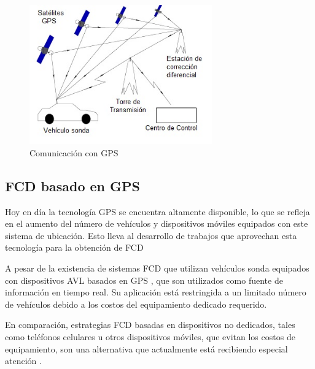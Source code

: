 \begin{figure}[h]
	\centering
	\includegraphics[width=0.7\textwidth]{capitulos/3/figuras/figura4.jpg}
	\caption{\label{fig:ComunicacionGPS}  Comunicación con GPS}	
\end{figure}

\subsection{FCD basado en GPS}


Hoy en día la tecnología GPS se encuentra altamente disponible, lo que se refleja en el aumento del número de vehículos y dispositivos móviles equipados con este sistema de ubicación. Esto lleva al desarrollo de trabajos que aprovechan esta tecnología para la obtención de FCD \cite{giovannini2011novel,li2007practical,sevlian2010travel,yin2004weight}


A pesar de la existencia de sistemas FCD que utilizan vehículos sonda equipados con dispositivos AVL basados en GPS \cite{simmons2002commercial,leduc2008road}, que son utilizados como fuente de información en tiempo real. Su aplicación está restringida a un limitado número de vehículos debido a los costos del equipamiento dedicado requerido. 

En comparación, estrategias FCD basadas en dispositivos no dedicados, tales como teléfonos celulares u otros dispositivos móviles, que evitan los costos de equipamiento, son una alternativa que actualmente está recibiendo especial atención \cite{thiagarajan2010cooperative,thiagarajan2009vtrack,de2008traffic}.

